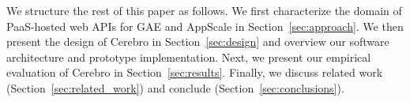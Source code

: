 
We structure the rest of this paper as follows.
We first characterize the domain of 
PaaS-hosted web APIs for GAE and AppScale 
in Section~\ref{sec:approach}.   
We then present the design of Cerebro in Section~\ref{sec:design}
and overview our software architecture and prototype implementation.
Next, we
present our empirical evaluation of Cerebro in 
Section~\ref{sec:results}.
Finally,  we discuss related work (Section~\ref{sec:related_work}) and 
conclude (Section~\ref{sec:conclusions}).
